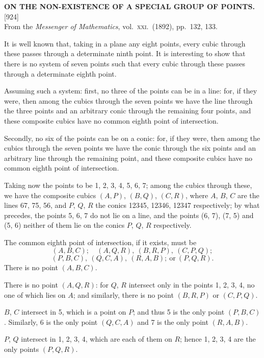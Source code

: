 \documentclass[11pt,a4paper]{article}
\newcommand{\paper}[3]{%
  \clearpage
  \begin{center}
    {\large\bfseries #2}\\[0.5em]
    {\small [#1]}\\[0.3em]
    {\small #3}
  \end{center}
  \vspace{0.5em}
}
\begin{document}
\paper{924}{ON THE NON-EXISTENCE OF A SPECIAL GROUP OF POINTS.}{From the \textit{Messenger of Mathematics}, vol.\ \textsc{xxi}.\ (1892), pp.\ 132, 133.}

It is well known that, taking in a plane any eight points, every cubic through these passes through a determinate ninth point. It is interesting to show that there is no system of seven points such that every cubic through these passes through a determinate eighth point.

Assuming such a system: first, no three of the points can be in a line: for, if they were, then among the cubics through the seven points we have the line through the three points and an arbitrary conic through the remaining four points, and these composite cubics have no common eighth point of intersection.

Secondly, no six of the points can be on a conic: for, if they were, then among the cubics through the seven points we have the conic through the six points and an arbitrary line through the remaining point, and these composite cubics have no common eighth point of intersection.

Taking now the points to be 1, 2, 3, 4, 5, 6, 7; among the cubics through these, we have the composite cubics $(A, P)$, $(B, Q)$, $(C, R)$, where $A$, $B$, $C$ are the lines 67, 75, 56, and $P$, $Q$, $R$ the conics 12345, 12346, 12347 respectively; by what precedes, the points 5, 6, 7 do not lie on a line, and the points (6, 7), (7, 5) and (5, 6) neither of them lie on the conics $P$, $Q$, $R$ respectively.

The common eighth point of intersection, if it exists, must be
\[
(A, B, C);\quad (A, Q, R),\ (B, R, P),\ (C, P, Q);
\]
\[
(P, B, C),\ (Q, C, A),\ (R, A, B);\ \text{or}\ (P, Q, R).
\]
There is no point $(A, B, C)$.

There is no point $(A, Q, R)$: for $Q$, $R$ intersect only in the points 1, 2, 3, 4, no one of which lies on $A$; and similarly, there is no point $(B, R, P)$ or $(C, P, Q)$.

$B$, $C$ intersect in 5, which is a point on $P$; and thus 5 is the only point $(P, B, C)$. Similarly, 6 is the only point $(Q, C, A)$ and 7 is the only point $(R, A, B)$.

$P$, $Q$ intersect in 1, 2, 3, 4, which are each of them on $R$; hence 1, 2, 3, 4 are the only points $(P, Q, R)$.
\end{document}
